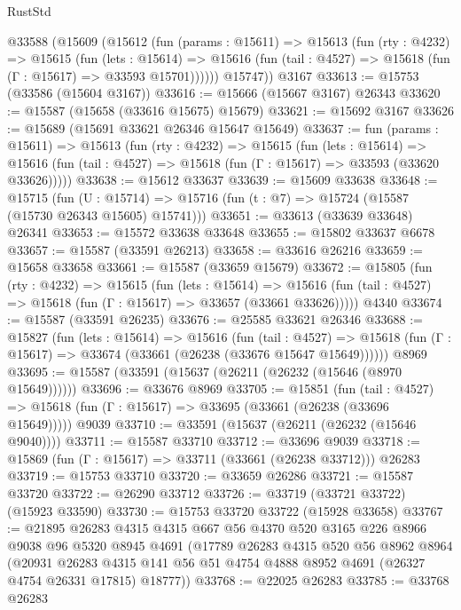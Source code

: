 \begin{lexlean}{RustStd}
\begin{coremodule}
    @33588
      (@15609
        (@15612
          (fun (params : @15611) =>
          @15613
            (fun (rty : @4232) =>
            @15615
              (fun (lets : @15614) =>
              @15616 (fun (tail : @4527) => @15618 (fun (Γ : @15617) => @33593 @15701))))))
        @15747))
    @3167
@33613 := @15753 (@33586 (@15604 @3167))
@33616 := @15666 (@15667 @3167) @26343
@33620 := @15587 (@15658 (@33616 @15675) @15679)
@33621 := @15692 @3167
@33626 := @15689 (@15691 @33621 @26346 @15647 @15649)
@33637 := fun (params : @15611) =>
  @15613
    (fun (rty : @4232) =>
    @15615
      (fun (lets : @15614) =>
      @15616 (fun (tail : @4527) => @15618 (fun (Γ : @15617) => @33593 (@33620 @33626)))))
@33638 := @15612 @33637
@33639 := @15609 @33638
@33648 := @15715
    (fun (U : @15714) => @15716 (fun (t : @7) => @15724 (@15587 (@15730 @26343 @15605) @15741)))
@33651 := @33613 (@33639 @33648) @26341
@33653 := @15572 @33638 @33648
@33655 := @15802 @33637 @6678
@33657 := @15587 (@33591 @26213)
@33658 := @33616 @26216
@33659 := @15658 @33658
@33661 := @15587 (@33659 @15679)
@33672 := @15805
    (fun (rty : @4232) =>
    @15615
      (fun (lets : @15614) =>
      @15616 (fun (tail : @4527) => @15618 (fun (Γ : @15617) => @33657 (@33661 @33626)))))
    @4340
@33674 := @15587 (@33591 @26235)
@33676 := @25585 @33621 @26346
@33688 := @15827
    (fun (lets : @15614) =>
    @15616
      (fun (tail : @4527) =>
      @15618 (fun (Γ : @15617) => @33674 (@33661 (@26238 (@33676 @15647 @15649))))))
    @8969
@33695 := @15587 (@33591 (@15637 (@26211 (@26232 (@15646 (@8970 @15649))))))
@33696 := @33676 @8969
@33705 := @15851
    (fun (tail : @4527) => @15618 (fun (Γ : @15617) => @33695 (@33661 (@26238 (@33696 @15649)))))
    @9039
@33710 := @33591 (@15637 (@26211 (@26232 (@15646 @9040))))
@33711 := @15587 @33710
@33712 := @33696 @9039
@33718 := @15869 (fun (Γ : @15617) => @33711 (@33661 (@26238 @33712))) @26283
@33719 := @15753 @33710
@33720 := @33659 @26286
@33721 := @15587 @33720
@33722 := @26290 @33712
@33726 := @33719 (@33721 @33722) (@15923 @33590)
@33730 := @15753 @33720 @33722 (@15928 @33658)
@33767 := @21895
    @26283
    @4315
    @4315
    @667
    @56
    @4370
    @520
    @3165
    @226
    @8966
    @9038
    @96
    @5320
    @8945
    @4691
    (@17789
      @26283
      @4315
      @520
      @56
      @8962
      @8964
      (@20931
        @26283
        @4315
        @141
        @56
        @51
        @4754
        @4888
        @8952
        @4691
        (@26327 @4754 @26331 @17815)
        @18777))
@33768 := @22025 @26283
@33785 := @33768
    @26283

\end{coremodule}
\end{lexlean}

